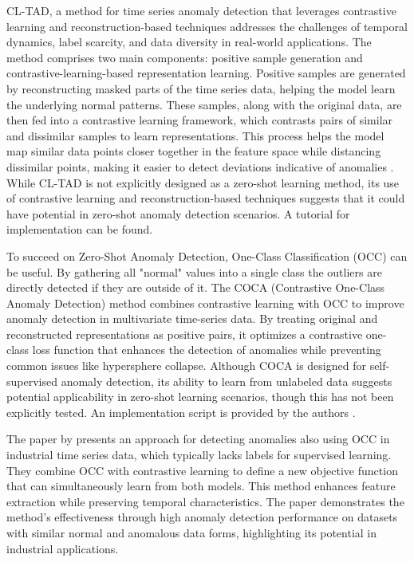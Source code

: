 CL-TAD, a method for time series anomaly detection that leverages contrastive learning and reconstruction-based techniques addresses the challenges of temporal dynamics, label scarcity, and data diversity in real-world applications. The method comprises two main components: positive sample generation and contrastive-learning-based representation learning. Positive samples are generated by reconstructing masked parts of the time series data, helping the model learn the underlying normal patterns. These samples, along with the original data, are then fed into a contrastive learning framework, which contrasts pairs of similar and dissimilar samples to learn representations. This process helps the model map similar data points closer together in the feature space while distancing dissimilar points, making it easier to detect deviations indicative of anomalies \cite{ngu_cl-tad_2023}.
While CL-TAD is not explicitly designed as a zero-shot learning method, its use of contrastive learning and reconstruction-based techniques suggests that it could have potential in zero-shot anomaly detection scenarios. A tutorial for implementation can be found.

To succeed on Zero-Shot Anomaly Detection, One-Class Classification (OCC) can be useful.
By gathering all "normal" values into a single class the outliers are directly detected if they are outside of it.
The COCA (Contrastive One-Class Anomaly Detection) method combines contrastive learning with OCC to improve anomaly detection in multivariate time-series data. By treating original and reconstructed representations as positive pairs, it optimizes a contrastive one-class loss function that enhances the detection of anomalies while preventing common issues like hypersphere collapse. Although COCA is designed for self-supervised anomaly detection, its ability to learn from unlabeled data suggests potential applicability in zero-shot learning scenarios, though this has not been explicitly tested. An implementation script is provided by the authors \cite{wang_deep_2023}.

%
The paper by \cite{lee_time_2023} presents an approach for detecting anomalies also using OCC in industrial time series data, which typically lacks labels for supervised learning. They combine OCC with contrastive learning to define a new objective function that can simultaneously learn from both models. This method enhances feature extraction while preserving temporal characteristics. The paper demonstrates the method's effectiveness through high anomaly detection performance on datasets with similar normal and anomalous data forms, highlighting its potential in industrial applications.

